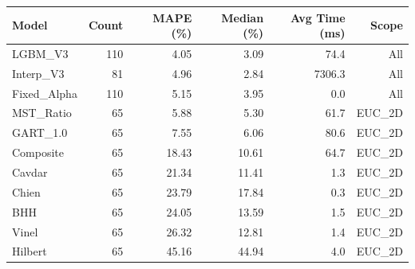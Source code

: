 \begin{tabular}{l r r r r r}
\toprule
Model & Count & MAPE (\%) & Median (\%) & Avg Time (ms) & Scope \\
\midrule
LGBM_V3 & 110 & 4.05 & 3.09 & 74.4 & All \\
Interp_V3 & 81 & 4.96 & 2.84 & 7306.3 & All \\
Fixed_Alpha & 110 & 5.15 & 3.95 & 0.0 & All \\
MST_Ratio & 65 & 5.88 & 5.30 & 61.7 & EUC\_2D \\
GART_1.0 & 65 & 7.55 & 6.06 & 80.6 & EUC\_2D \\
Composite & 65 & 18.43 & 10.61 & 64.7 & EUC\_2D \\
Cavdar & 65 & 21.34 & 11.41 & 1.3 & EUC\_2D \\
Chien & 65 & 23.79 & 17.84 & 0.3 & EUC\_2D \\
BHH & 65 & 24.05 & 13.59 & 1.5 & EUC\_2D \\
Vinel & 65 & 26.32 & 12.81 & 1.4 & EUC\_2D \\
Hilbert & 65 & 45.16 & 44.94 & 4.0 & EUC\_2D \\
\bottomrule
\end{tabular}
